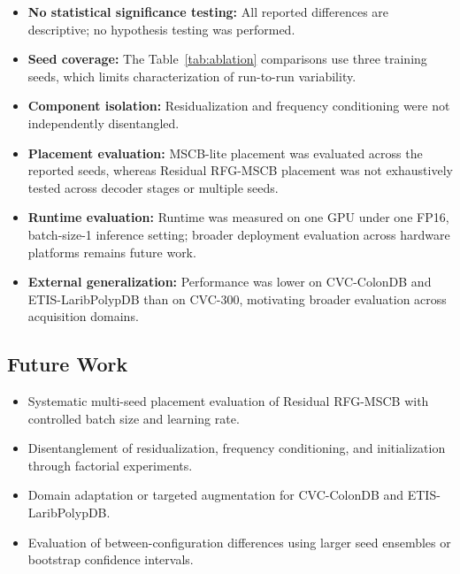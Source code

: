 \begin{itemize}
\item \textbf{No statistical significance testing:} All reported differences are descriptive; no hypothesis testing was performed.
\item \textbf{Seed coverage:} The Table~\ref{tab:ablation} comparisons use three training seeds, which limits characterization of run-to-run variability.
\item \textbf{Component isolation:} Residualization and frequency conditioning were not independently disentangled.
\item \textbf{Placement evaluation:} MSCB-lite placement was evaluated across the reported seeds, whereas Residual RFG-MSCB placement was not exhaustively tested across decoder stages or multiple seeds.
\item \textbf{Runtime evaluation:} Runtime was measured on one GPU under one FP16, batch-size-1 inference setting; broader deployment evaluation across hardware platforms remains future work.
\item \textbf{External generalization:} Performance was lower on CVC-ColonDB and ETIS-LaribPolypDB than on CVC-300, motivating broader evaluation across acquisition domains.
\end{itemize}

\subsection{Future Work}

\begin{itemize}
\item Systematic multi-seed placement evaluation of Residual RFG-MSCB with controlled batch size and learning rate.
\item Disentanglement of residualization, frequency conditioning, and initialization through factorial experiments.
\item Domain adaptation or targeted augmentation for CVC-ColonDB and ETIS-LaribPolypDB.
\item Evaluation of between-configuration differences using larger seed ensembles or bootstrap confidence intervals.
\end{itemize}
